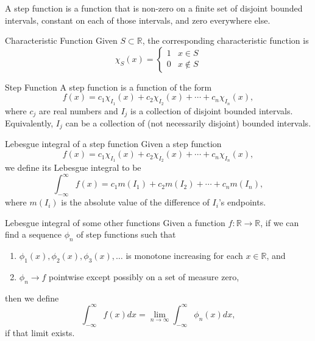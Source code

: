 A step function is a function that is non-zero on a finite set of disjoint bounded intervals, constant on each of those intervals, and zero everywhere else.

\begin{defn}{Characteristic Function}{}
  Given \(S \subset \mathbb{R}\), the corresponding characteristic function is \[
    \chi_S(x) =
    \begin{cases}
      1 & x \in S \\
      0 & x \notin S
    \end{cases}
  \] 
\end{defn}

\begin{defn}{Step Function}{}
  A step function is a function of the form \[
    f(x) = c_1\chi_{I_1}(x) + c_2\chi_{I_2}(x) + \cdots + c_n\chi_{I_n}(x),
  \] 
  where \(c_j\) are real numbers and \(I_j\) is a collection of disjoint bounded intervals.
  Equivalently, \(I_j\) can be a collection of (not necessarily disjoint) bounded intervals.
\end{defn}

\begin{defn}{Lebesgue integral of a step function}{}
  Given a step function \[
    f(x) = c_1\chi_{I_1}(x) + c_2\chi_{I_2}(x) + \cdots + c_n\chi_{I_n}(x),
  \] we define its Lebesgue integral to be \[
    \int_{-\infty}^\infty f(x) = c_1m(I_1) + c_2m(I_2) + \cdots + c_nm(I_n),
  \] 
  where \(m(I_i)\) is the absolute value of the difference of \(I_i\)'s endpoints.
\end{defn}

\begin{defn}{Lebesgue integral of some other functions}{}
  Given a function \(f\colon \mathbb{R} \to \mathbb{R}\), if we can find a sequence \(\phi_n\) of step functions such that
  \begin{enumerate}
    \item \(\phi_1(x), \phi_2(x), \phi_3(x), \dots\) is monotone increasing for each \(x \in \mathbb{R}\), and
    \item \(\phi_n \to f\) pointwise except possibly on a set of measure zero,
  \end{enumerate}
  then we define \[
    \int_{-\infty}^\infty f(x)dx = \lim_{n\to\infty} \int_{-\infty}^\infty \phi_n(x)dx,
  \] 
  if that limit exists.
\end{defn}
